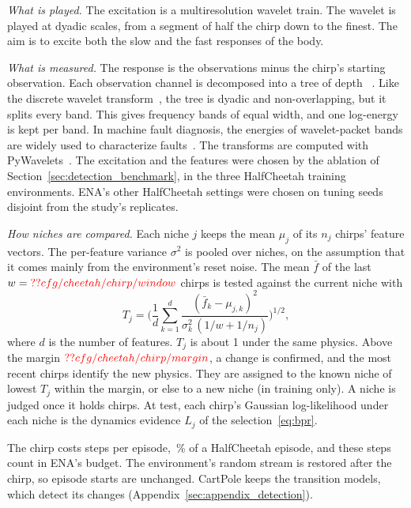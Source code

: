 \textit{What is played.} The excitation is a multiresolution wavelet train. The  wavelet is played at dyadic scales, from a segment of half the chirp down to the finest. The aim is to excite both the slow and the fast responses of the body.

\textit{What is measured.} The response is the observations minus the chirp's starting observation. Each observation channel is decomposed into a   tree of depth ~\cite{coifman1992entropy}. Like the discrete wavelet transform~\cite{mallat1989theory}, the tree is dyadic and non-overlapping, but it splits every band. This gives  frequency bands of equal width, and one log-energy is kept per band. In machine fault diagnosis, the energies of wavelet-packet bands are widely used to characterize faults~\cite{yan2014wavelets}. The transforms are computed with PyWavelets~\cite{lee2019pywavelets}. The excitation and the features were chosen by the ablation of Section~\ref{sec:detection_benchmark}, in the three HalfCheetah training environments. ENA's other HalfCheetah settings were chosen on tuning seeds disjoint from the study's replicates.

\textit{How niches are compared.} Each niche $j$ keeps the mean $\mu_j$ of its $n_j$ chirps' feature vectors. The per-feature variance $\sigma^2$ is pooled over niches, on the assumption that it comes mainly from the environment's reset noise. The mean $\bar{f}$ of the last $w = \Res{cfg/cheetah/chirp/window}$ chirps is tested against the current niche with
\begin{equation}
T_j = \Bigg(\frac{1}{d}\sum_{k=1}^{d} \frac{(\bar{f}_k - \mu_{j,k})^2}{\sigma_k^2\,(1/w + 1/n_j)}\Bigg)^{1/2},
\label{eq:chirp}
\end{equation}
where $d$ is the number of features. $T_j$ is about 1 under the same physics. Above the margin $\Res{cfg/cheetah/chirp/margin}$, a change is confirmed, and the most recent chirps identify the new physics. They are assigned to the known niche of lowest $T_j$ within the margin, or else to a new niche (in training only). A niche is judged once it holds  chirps. At test, each chirp's Gaussian log-likelihood under each niche is the dynamics evidence $L_j$ of the selection~\eqref{eq:bpr}.

The chirp costs  steps per episode, \,\% of a HalfCheetah episode, and these steps count in ENA's budget. The environment's random stream is restored after the chirp, so episode starts are unchanged. CartPole keeps the transition models, which detect its changes (Appendix~\ref{sec:appendix_detection}).

